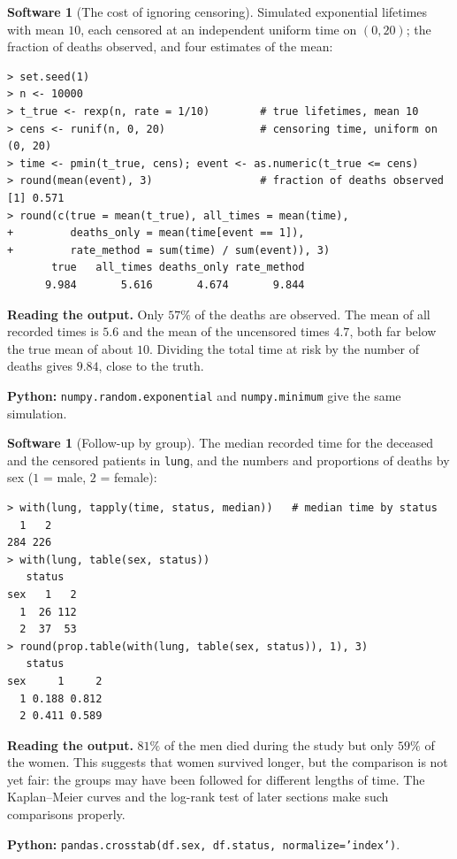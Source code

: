 \documentclass[11pt,a4paper]{article}
\numberwithin{equation}{section}
\theoremstyle{definition}
\newtheorem{software}[thm]{Software}
\begin{document}
\begin{software}[The cost of ignoring censoring]
\label{sw:bias}
Simulated exponential lifetimes with mean $10$, each censored at an independent uniform time on $(0, 20)$; the fraction of deaths observed, and four estimates of the mean:
{\small\begin{verbatim}
> set.seed(1)
> n <- 10000
> t_true <- rexp(n, rate = 1/10)        # true lifetimes, mean 10
> cens <- runif(n, 0, 20)               # censoring time, uniform on (0, 20)
> time <- pmin(t_true, cens); event <- as.numeric(t_true <= cens)
> round(mean(event), 3)                 # fraction of deaths observed
[1] 0.571
> round(c(true = mean(t_true), all_times = mean(time),
+         deaths_only = mean(time[event == 1]),
+         rate_method = sum(time) / sum(event)), 3)
       true   all_times deaths_only rate_method 
      9.984       5.616       4.674       9.844 
\end{verbatim}}
\textbf{Reading the output.} Only $57\%$ of the deaths are observed. The mean of all recorded times is $5.6$ and the mean of the uncensored times $4.7$, both far below the true mean of about $10$. Dividing the total time at risk by the number of deaths gives $9.84$, close to the truth.

\textbf{Python:} \texttt{numpy.random.exponential} and \texttt{numpy.minimum} give the same simulation.
\end{software}

\begin{software}[Follow-up by group]
\label{sw:followup}
The median recorded time for the deceased and the censored patients in \texttt{lung}, and the numbers and proportions of deaths by sex ($1$ = male, $2$ = female):
{\small\begin{verbatim}
> with(lung, tapply(time, status, median))   # median time by status
  1   2 
284 226 
> with(lung, table(sex, status))
   status
sex   1   2
  1  26 112
  2  37  53
> round(prop.table(with(lung, table(sex, status)), 1), 3)
   status
sex     1     2
  1 0.188 0.812
  2 0.411 0.589
\end{verbatim}}
\textbf{Reading the output.} $81\%$ of the men died during the study but only $59\%$ of the women. This suggests that women survived longer, but the comparison is not yet fair: the groups may have been followed for different lengths of time. The Kaplan--Meier curves and the log-rank test of later sections make such comparisons properly.

\textbf{Python:} \texttt{pandas.crosstab(df.sex, df.status, normalize='index')}.
\end{software}
\end{document}
